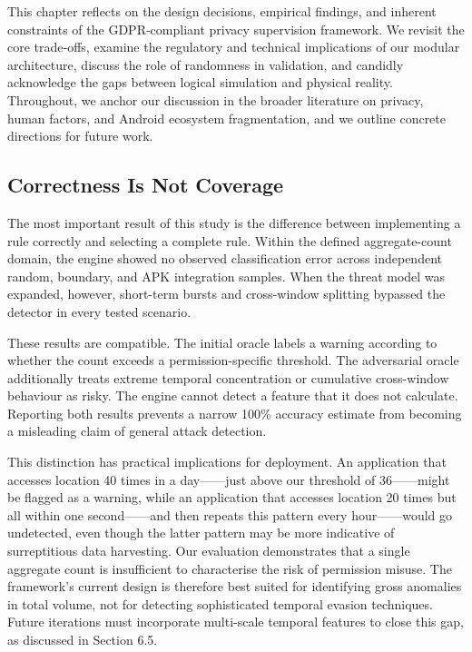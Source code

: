 This chapter reflects on the design decisions, empirical findings, and inherent constraints of the GDPR‑compliant privacy supervision framework. We revisit the core trade‑offs, examine the regulatory and technical implications of our modular architecture, discuss the role of randomness in validation, and candidly acknowledge the gaps between logical simulation and physical reality. Throughout, we anchor our discussion in the broader literature on privacy, human factors, and Android ecosystem fragmentation, and we outline concrete directions for future work.

\subsection{Correctness Is Not Coverage}

The most important result of this study is the difference between implementing a rule correctly and selecting a complete rule. Within the defined aggregate-count domain, the engine showed no observed classification error across independent random, boundary, and APK integration samples. When the threat model was expanded, however, short-term bursts and cross-window splitting bypassed the detector in every tested scenario.

These results are compatible. The initial oracle labels a warning according to whether the count exceeds a permission-specific threshold. The adversarial oracle additionally treats extreme temporal concentration or cumulative cross-window behaviour as risky. The engine cannot detect a feature that it does not calculate. Reporting both results prevents a narrow 100\% accuracy estimate from becoming a misleading claim of general attack detection.

This distinction has practical implications for deployment. An application that accesses location 40 times in a day——just above our threshold of 36——might be flagged as a warning, while an application that accesses location 20 times but all within one second——and then repeats this pattern every hour——would go undetected, even though the latter pattern may be more indicative of surreptitious data harvesting. Our evaluation demonstrates that a single aggregate count is insufficient to characterise the risk of permission misuse. The framework's current design is therefore best suited for identifying gross anomalies in total volume, not for detecting sophisticated temporal evasion techniques. Future iterations must incorporate multi-scale temporal features to close this gap, as discussed in Section 6.5.

